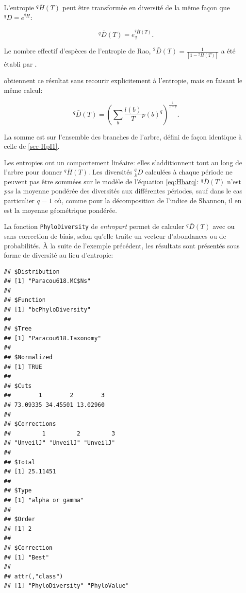 \documentclass[
  11pt,
  french,
  a4paper,
  extrafontsizes,onecolumn,openright
  ]{memoir}
\newenvironment{Shaded}{\begin{snugshade}}{\end{snugshade}}
\newcommand{\DecValTok}[1]{\textcolor[rgb]{0.00,0.00,0.81}{#1}}
\newcommand{\KeywordTok}[1]{\textcolor[rgb]{0.13,0.29,0.53}{\textbf{#1}}}
\newcommand{\NormalTok}[1]{#1}
\newcommand{\OperatorTok}[1]{\textcolor[rgb]{0.81,0.36,0.00}{\textbf{#1}}}
\begin{document}
L'entropie \(^{q}\!\bar{H}(T)\) peut être transformée en diversité \autocite{Marcon2014a} de la même façon que \(^{q}\!D = e^{^{q}\!H}\):

\begin{equation}
  \label{eq:DbarqT}
  ^{q}\!\bar{D}\left(T\right)=e^{^{q}\!\bar{H}\left(T\right)}_q.
\end{equation}

Le nombre effectif d'espèces de l'entropie de Rao, \({^{2}\!\bar{D}}(T)=\frac{1}{[1-{^{2}\!\bar{H}}(T)]}\) a été établi par \textcite{Ricotta2009}.

\textcite{Chao2010} obtiennent ce résultat sans recourir explicitement à l'entropie, mais en faisant le même calcul:

\begin{equation}
  \label{eq:DbarqChao}
  {^{q}\!\bar{D}} \left( T \right)
  =\left( \sum_b{\frac{l(b)}{T} p(b)^q} \right)^{\frac{1}{1-q}}.
\end{equation}

La somme est sur l'ensemble des branches de l'arbre, défini de façon identique à celle de \textcite{Allen2009} \ref{sec-HpI1}.

Les entropies ont un comportement linéaire: elles s'additionnent tout au long de l'arbre pour donner \(^{q}\!\bar{H}(T)\).
Les diversités \(^{q}_{k}\!D\) calculées à chaque période ne peuvent pas être sommées sur le modèle de l'équation \eqref{eq:Hbarq}: \(^{q}\!\bar{D}(T)\) n'est \emph{pas} la moyenne pondérée des diversités aux différentes périodes, sauf dans le cas particulier \(q=1\) où, comme pour la décomposition de l'indice de Shannon, il en est la moyenne géométrique pondérée.

La fonction \texttt{PhyloDiversity} de \emph{entropart} permet de calculer \(^{q}\!\bar{D}(T)\) avec ou sans correction de biais, selon qu'elle traite un vecteur d'abondances ou de probabilités.
À la suite de l'exemple précédent, les résultats sont présentés sous forme de diversité au lieu d'entropie:

\scriptsize

\begin{Shaded}
\end{Shaded}

\begin{verbatim}
## $Distribution
## [1] "Paracou618.MC$Ns"
## 
## $Function
## [1] "bcPhyloDiversity"
## 
## $Tree
## [1] "Paracou618.Taxonomy"
## 
## $Normalized
## [1] TRUE
## 
## $Cuts
##        1        2        3 
## 73.09335 34.45501 13.02960 
## 
## $Corrections
##         1         2         3 
## "UnveilJ" "UnveilJ" "UnveilJ" 
## 
## $Total
## [1] 25.11451
## 
## $Type
## [1] "alpha or gamma"
## 
## $Order
## [1] 2
## 
## $Correction
## [1] "Best"
## 
## attr(,"class")
## [1] "PhyloDiversity" "PhyloValue"
\end{verbatim}
\end{document}
